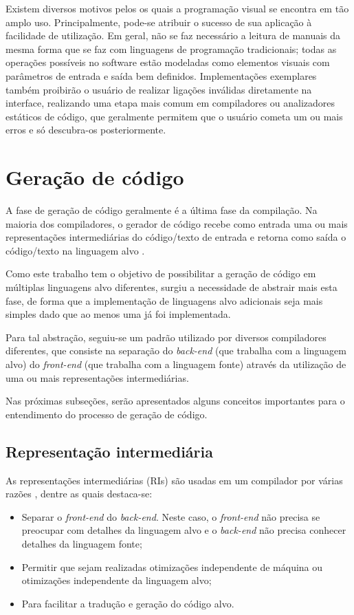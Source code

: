 \documentclass[
	12pt,				%
	openright,			%
	oneside,			%
	a4paper,			%
	main=brazil,
	english,			%
	]{ufsj-abntex2}
\begin{document}
Existem diversos motivos pelos os quais a programação visual se encontra em tão amplo uso. Principalmente, pode-se atribuir o sucesso de sua aplicação à facilidade de utilização. Em geral, não se faz necessário a leitura de manuais da mesma forma que se faz com linguagens de programação tradicionais; todas as operações possíveis no software estão modeladas como elementos visuais com parâmetros de entrada e saída bem definidos. Implementações exemplares também proibirão o usuário de realizar ligações inválidas diretamente na interface, realizando uma etapa mais comum em compiladores ou analizadores estáticos de código, que geralmente permitem que o usuário cometa um ou mais erros e só descubra-os posteriormente.

\section{Geração de código}

A fase de geração de código geralmente é a última fase da compilação. Na maioria dos compiladores, o gerador de código recebe como entrada uma ou mais representações intermediárias do código/texto de entrada e retorna como saída o código/texto na linguagem alvo \cite{dragonBook}. 

Como este trabalho tem o objetivo de possibilitar a geração de código em múltiplas linguagens alvo diferentes, surgiu a necessidade de abstrair mais esta fase, de forma que a implementação de linguagens alvo adicionais seja mais simples dado que ao menos uma já foi implementada.

Para tal abstração, seguiu-se um padrão utilizado por diversos compiladores diferentes, que consiste na separação do \textit{back-end} (que trabalha com a linguagem alvo) do \textit{front-end} (que trabalha com a linguagem fonte) através da utilização de uma ou mais representações intermediárias. 

Nas próximas subseções, serão apresentados alguns conceitos importantes para o entendimento do processo de geração de código. 

\subsection{Representação intermediária}

As representações intermediárias (RIs) são usadas em um compilador por várias razões \cite{dragonBook}, dentre as quais destaca-se: 
\begin{itemize}
    \item Separar o \textit{front-end} do \textit{back-end}. Neste caso, o \textit{front-end} não precisa se preocupar com detalhes da linguagem alvo e o \textit{back-end} não precisa conhecer detalhes da linguagem fonte;
    \item Permitir que sejam realizadas otimizações independente de máquina ou otimizações independente da linguagem alvo; 
    \item Para facilitar a tradução e geração do código alvo.    
\end{itemize}
\end{document}
